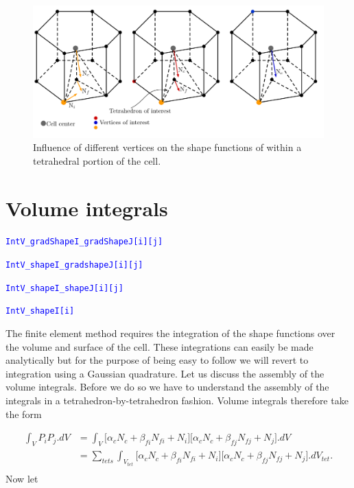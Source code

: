 \documentclass[11pt,letterpaper,titlepage]{article}
\newcommand{\beqn}{\begin{equation}
	\begin{aligned}}
\newcommand{\eeqn}{\end{aligned}
	\end{equation}}
\newcommand{\xmltag}[1]{\textcolor{blue}{ \texttt{#1}} }
\begin{document}
\begin{figure}[H]
\centering
\includegraphics[width=1\linewidth]{LatexDraw/ThreeDTetrahedralShape}
\caption{Influence of different vertices on the shape functions of within a tetrahedral portion of the cell.}
\label{fig:threedtetrahedralshape}
\end{figure}





\newpage
{}
\section{Volume integrals}
\xmltag{IntV\_gradShapeI\_gradShapeJ[i][j]}

\xmltag{IntV\_shapeI\_gradshapeJ[i][j]}

\xmltag{IntV\_shapeI\_shapeJ[i][j]}

\xmltag{IntV\_shapeI[i]}

\vspace{0.5cm}
The finite element method requires the integration of the shape functions over the volume and surface of the cell. These integrations can easily be made analytically but for the purpose of being easy to follow we will revert to integration using a Gaussian quadrature. Let us discuss the assembly of the volume integrals. Before we do so we have to understand the assembly of the integrals in a tetrahedron-by-tetrahedron fashion. Volume integrals therefore take the form

\beqn 
\int_V P_i P_j .dV 
&= \int_V 
\biggr[  
\alpha_c N_c + \beta_{fi} N_{fi} + N_i
\biggr] 
\biggr[  
\alpha_c N_c + 
\beta_{fj} N_{fj} + 
N_j
\biggr] .dV
\\
&=\sum_{tets}
\int_{V_{tet}}
\biggr[  
\alpha_c N_c + \beta_{fi} N_{fi} + N_i
\biggr] 
\biggr[  
\alpha_c N_c + 
\beta_{fj} N_{fj} + 
N_j
\biggr] .dV_{tet}.\\
\eeqn
\newline
Now let 
\end{document}
